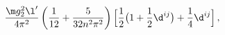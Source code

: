 \begin{equation}
\frac{\m g_2^2\l'}{4\pi^2}\left(\frac{1}{12}+\frac{5}{32n^2\pi^2}\right)
\Bigl[\frac{1}{2}\bigl(1+\frac{1}{2}\d^{ij}\bigr)+\frac{1}{4}\d^{ij}\Bigr]\,,
\end{equation}

